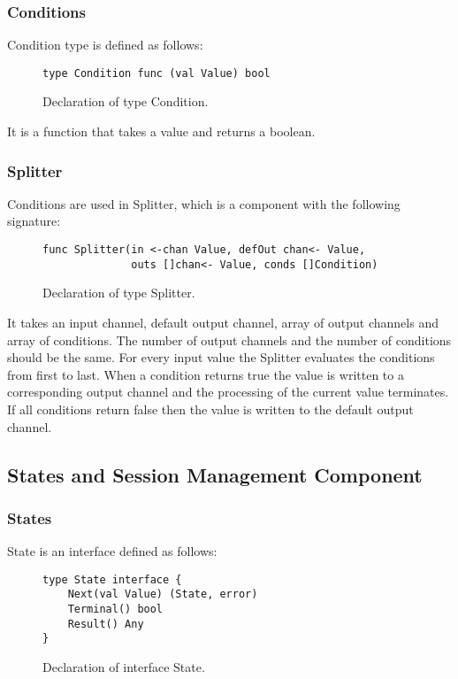 \documentclass[12pt,a4paper]{article}
\begin{document}
\subsubsection{Conditions}
Condition type is defined as follows:

\begin{figure}[h]
\centering
\begin{lstlisting}
type Condition func (val Value) bool
\end{lstlisting}
\caption[scale=1.0]{Declaration of type Condition.}
\label{fig:Condition}
\end{figure}

It is a function that takes a value and returns a boolean.

\subsubsection{Splitter}
Conditions are used in Splitter, which is a component with the 
following signature:

\begin{figure}[h]
\centering
\begin{lstlisting}
func Splitter(in <-chan Value, defOut chan<- Value, 
			  outs []chan<- Value, conds []Condition)
\end{lstlisting}
\caption[scale=1.0]{Declaration of type Splitter.}
\label{fig:Splitter}
\end{figure}

It takes an input channel, default output channel, array of output channels and array of conditions.
The number of output channels and the number of conditions should be the same.
For every input value the Splitter evaluates the conditions from first to last.
When a condition returns true the value is written to a corresponding output channel 
and the processing of the current value terminates. If all conditions return false
then the value is written to the default output channel.

\subsection{States and Session Management Component}
\subsubsection{States}
State is an interface defined as follows:

\begin{figure}[h]
\centering
\begin{lstlisting}
type State interface {
    Next(val Value) (State, error)
    Terminal() bool
    Result() Any
}
\end{lstlisting}
\caption[scale=1.0]{Declaration of interface State.}
\label{fig:State}
\end{figure}
\end{document}
